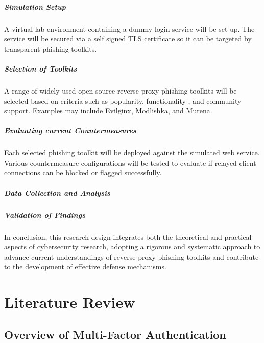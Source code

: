 \documentclass[12pt]{scrbook}
\begin{document}
\paragraph{Simulation Setup}
A virtual lab environment containing a dummy login service will be set up.
The service will be secured via a self signed TLS certificate so it can be targeted
by transparent phishing toolkits.

\paragraph{Selection of Toolkits}
A range of widely-used open-source reverse proxy
phishing toolkits will be selected based on criteria such as popularity, functionality
, and community support. Examples may include Evilginx, Modlishka, and Murena.

\paragraph{Evaluating current Countermeasures}
Each selected phishing toolkit will be deployed against the simulated web service.
Various countermeasure configurations will be tested to evaluate if relayed client connections
can be blocked or flagged successfully.

\paragraph{Data Collection and Analysis}

\paragraph{Validation of Findings}

In conclusion, this research design integrates both the theoretical and practical
aspects of cybersecurity research, adopting a rigorous and systematic approach
to advance current understandings of reverse proxy phishing toolkits and contribute
to the development of effective defense mechanisms.

\newpage \chapter{Literature Review} \section{Overview of Multi-Factor
Authentication}
\end{document}
